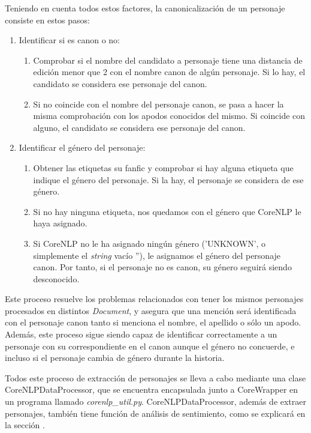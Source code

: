 \documentclass{pre-tfg}
\begin{document}
Teniendo en cuenta todos estos factores, la canonicalización de un personaje consiste en estos pasos:
\begin{enumerate}
	\item Identificar si es canon o no:
	\begin{enumerate}
		\item Comprobar si el nombre del candidato a personaje tiene una distancia de edición menor que 2 con el nombre canon de algún personaje. Si lo hay, el candidato se considera ese personaje del canon.
		\item Si no coincide con el nombre del personaje canon, se pasa a hacer la misma comprobación con los apodos conocidos del mismo. Si coincide con alguno, el candidato se considera ese personaje del canon.
	\end{enumerate}
	
	\item Identificar el género del personaje:
	\begin{enumerate}
		\item  Obtener las etiquetas su fanfic y comprobar si hay alguna etiqueta que indique el género del personaje. Si la hay, el personaje se considera de ese género.
		\item Si no hay ninguna etiqueta, nos quedamos con el género que CoreNLP le haya asignado.
		\item Si CoreNLP no le ha asignado ningún género ('UNKNOWN', o simplemente el \textit{string} vacío ''), le asignamos el género del personaje canon. Por tanto, si el personaje no es canon, su género seguirá siendo desconocido.
	\end{enumerate}
\end{enumerate}

Este proceso resuelve los problemas relacionados con tener los mismos personajes procesados en distintos \textit{Document}, y asegura que una mención será identificada con el personaje canon tanto si menciona el nombre, el apellido o sólo un apodo. Además, este proceso sigue siendo capaz de identificar correctamente a un personaje con su correspondiente en el canon aunque el género no concuerde, e incluso si el personaje cambia de género durante la historia.

Todos este proceso de extracción de personajes se lleva a cabo mediante una clase CoreNLPDataProcessor, que se encuentra encapsulada junto a CoreWrapper en un programa llamado \textit{corenlp\_util.py}. CoreNLPDataProcessor, además de extraer personajes, también tiene función de análisis de sentimiento, como se explicará en la sección .
\end{document}
